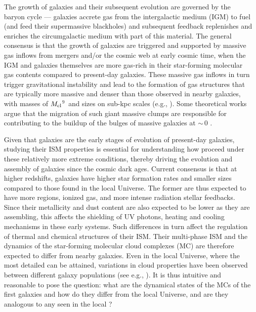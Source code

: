 \IfFileExists{emulateapjlegacy.cls}{\documentclass[iop]{emulateapjlegacy}}{\documentclass[iop]{emulateapj}}
\begin{document}
The growth of galaxies and their subsequent evolution are governed by the baryon cycle --- galaxies accrete gas from the intergalactic medium (IGM) to fuel \SF (and feed their supermassive blackholes) and subsequent feedback replenishes and enriches the circumgalactic medium with part of this material. The general consensus is that the growth of \highz galaxies are triggered and supported by massive gas inflows from mergers and/or the cosmic web at early cosmic time, when the IGM and galaxies themselves are more gas-rich in their star-forming molecular gas contents compared to present-day galaxies.
These massive gas inflows in turn trigger gravitational instability and lead
to the formation of gas structures that are typically more massive and denser than those
observed in nearby galaxies, with masses of $M_{\rm cl}$$^9$\,\Msun
and sizes on sub-kpc scales (e.g., \citealt{Gabor13a, Hopkins14a, Inoue16a}).
Some theoretical works argue that the
migration of such giant massive clumps are responsible for contributing to the
buildup of the bulges of massive galaxies at \z$\sim$\,0 \citep[e.g.,][]{Ceverino10a}.

Given that \highz galaxies are the early stages of evolution of present-day galaxies, studying their ISM properties is essential for understanding how \SF proceed under these relatively more extreme conditions, thereby driving the evolution and assembly
of galaxies
since the cosmic dark ages.
Current consensus is that at higher redshifts, galaxies have higher
star formation rates \citep[SFR; ][]{Behroozi13b, Sparre15a, Maiolino15a, Dunlop17a} and
smaller sizes \citep[e.g.,][]{Bouwens11a, Ono13a} compared to those found in the local Universe.
The former are thus expected to have more  regions, ionized gas, and more intense radiation stellar feedbacks.
Since their metallicity and dust content are also expected to be lower as they are assembling,
this affects the shielding of UV photons, heating and cooling mechanisms in these early systems. Such differences in turn
affect the regulation of thermal and chemical structures of their ISM.
Their multi-phase ISM and the dynamics of the star-forming molecular cloud complexes (MC)
are therefore expected to differ from nearby galaxies.
Even in the local Universe, where the most detailed \obs can be attained, variations in cloud properties have been
observed between different galaxy populations (see e.g., \citealt{Hughes10a, Hughes13b}).
It is thus intuitive and reasonable to pose the question: what are the dynamical states of the MCs of the first galaxies and
how do they differ from the local Universe, and are they analogous to any seen in the local \galpop?
%
\end{document}
